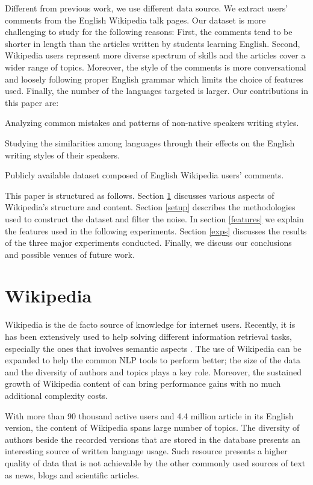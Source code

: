 \documentclass[10pt,a5paper,twoside]{article}
\begin{document}
Different from previous work, we use different data source. We extract users'
comments from the English Wikipedia talk pages. Our dataset is more challenging to study for the following reasons:
First, the comments tend to be shorter in length than the articles written by
students learning English. Second, Wikipedia users represent more diverse
spectrum of skills and the articles cover a wider range of topics. Moreover, the
style of the comments is more conversational and loosely following proper English
grammar which limits the choice of features used. Finally, the number of the
languages targeted is larger. Our contributions in this paper are:
\begin{compactitem}
\item Analyzing common mistakes and patterns of non-native
speakers writing styles.
\item Studying the similarities among languages through their effects on the
English writing styles of their speakers.
\item Publicly available dataset composed of English Wikipedia users' comments.
\end{compactitem}

This paper is structured as follows. Section \ref{wiki} discusses various
aspects of Wikipedia's structure and content. Section \ref{setup} describes
the methodologies used to construct the dataset and filter the noise. In section
\ref{features} we explain the features used in the following experiments.
Section \ref{exps} discusses the results of the three major experiments conducted.
Finally, we discuss our conclusions and possible venues of future work.

\section{Wikipedia}
\label{wiki}
Wikipedia is the de facto source of knowledge for internet users. Recently, it
is has been extensively used to help solving different information retrieval
tasks, especially the ones that involves semantic aspects \cite{Milne08aneffective}.
The use of Wikipedia can be expanded to help the
 common NLP tools to perform better; the size of the data and the diversity of
 authors and topics plays a key role. Moreover, the sustained growth of Wikipedia
 content of can bring performance gains with no much additional complexity costs.

With more than 90 thousand active users and 4.4 million article in its English
version, the content of Wikipedia spans large number of topics. The diversity
of authors beside the recorded versions that are stored in the database presents
an interesting source of written language usage. Such resource presents a higher quality of data that is not achievable by the other commonly used sources of text as news, blogs and scientific articles.
\end{document}
